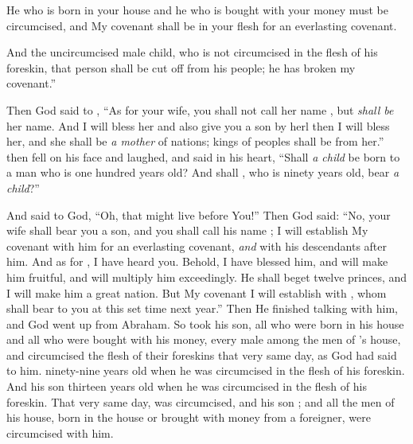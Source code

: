 \bverse He who is born in your house and he who is bought with your money must be circumcised, and My covenant shall be in your flesh for an everlasting covenant.

\bverse And the uncircumcised male child, who is not circumcised in the flesh of his foreskin, that person shall be cut off from his people; he has broken my covenant.''

\bverse Then God said to \Abraham, ``As for  your wife, you shall not call her name , but \Sarah \textit{shall be} her name.
\bverse And I will bless her and also give you a son by herl then I will bless her, and she shall be \textit{a mother} of nations; kings of peoples shall be from her.''
\bverse then \Abraham fell on his face and laughed, and said in his heart, ``Shall \textit{a child} be born to a man who is one hundred years old? And shall \Sarah, who is ninety years old, bear \textit{a child}?''

\bverse And \Abraham said to God, ``Oh, that \Ishmael might live before You!''
\bverse Then God said: ``No, \Sarah your wife shall bear you a son, and you shall call his name \Isaac; I will establish My covenant with him for an everlasting covenant, \textit{and} with his descendants after him.
\bverse And as for \Ishmael, I have heard you. Behold, I have blessed him, and will make him fruitful, and will multiply him exceedingly. He shall beget twelve princes, and I will make him a great nation.
\bverse But My covenant I will establish with \Isaac, whom \Sarah shall bear to you at this set time next year.''
\bverse Then He finished talking with him, and God went up from Abraham.
\bverse So \Abraham took \Ishmael his son, all who were born in his house and all who were bought with his money, every male among the men of \Abraham's house, and circumcised the flesh of their foreskins that very same day, as God had said to him.
\bverse \Abraham \was ninety-nine years old when he was circumcised in the flesh of his foreskin.
\bverse And \Ishmael his son \was thirteen years old when he was circumcised in the flesh of his foreskin.
\bverse That very same day, \Abraham was circumcised, and his son \Ishmael;
\bverse and all the men of his house, born in the house or brought with money from a foreigner, were circumcised with him.

